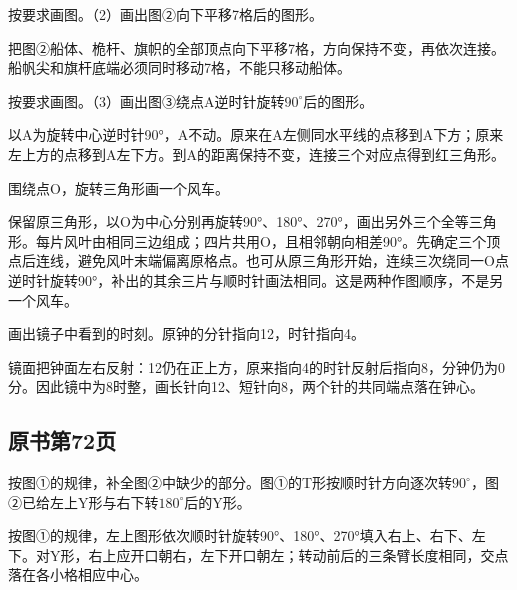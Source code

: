 按要求画图。（2）画出图②向下平移7格后的图形。\par
{}
\begin{BookAnswer}
把图②船体、桅杆、旗帜的全部顶点向下平移7格，方向保持不变，再依次连接。船帆尖和旗杆底端必须同时移动7格，不能只移动船体。
\end{BookAnswer}

按要求画图。（3）画出图③绕点A逆时针旋转\(90^\circ\)后的图形。\par
{}
\begin{BookAnswer}
以A为旋转中心逆时针90°，A不动。原来在A左侧同水平线的点移到A下方；原来左上方的点移到A左下方。到A的距离保持不变，连接三个对应点得到红三角形。
\end{BookAnswer}

围绕点O，旋转三角形画一个风车。\par
{}
\begin{BookAnswer}
保留原三角形，以O为中心分别再旋转90°、180°、270°，画出另外三个全等三角形。每片风叶由相同三边组成；四片共用O，且相邻朝向相差90°。先确定三个顶点后连线，避免风叶末端偏离原格点。也可从原三角形开始，连续三次绕同一O点逆时针旋转90°，补出的其余三片与顺时针画法相同。这是两种作图顺序，不是另一个风车。
\end{BookAnswer}

画出镜子中看到的时刻。原钟的分针指向12，时针指向4。\par
{}
\begin{BookAnswer}
镜面把钟面左右反射：12仍在正上方，原来指向4的时针反射后指向8，分钟仍为0分。因此镜中为8时整，画长针向12、短针向8，两个针的共同端点落在钟心。
\end{BookAnswer}



\subsection*{原书第72页}

按图①的规律，补全图②中缺少的部分。图①的T形按顺时针方向逐次转\(90^\circ\)，图②已给左上Y形与右下转\(180^\circ\)后的Y形。\par
{}
\begin{BookAnswer}
按图①的规律，左上图形依次顺时针旋转90°、180°、270°填入右上、右下、左下。对Y形，右上应开口朝右，左下开口朝左；转动前后的三条臂长度相同，交点落在各小格相应中心。
\end{BookAnswer}

